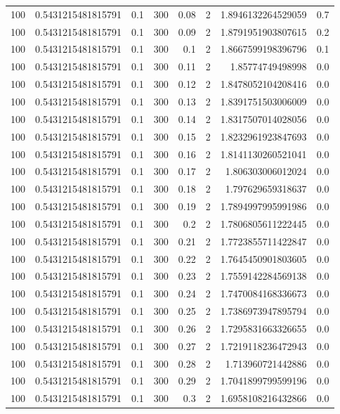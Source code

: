 \documentclass[11pt]{article}
\begin{document}
\begin{center}
\begin{tabular}{rrrrrrrr}
100 & 0.5431215481815791 & 0.1 & 300 & 0.08 & 2 & 1.8946132264529059 & 0.7\\
100 & 0.5431215481815791 & 0.1 & 300 & 0.09 & 2 & 1.8791951903807615 & 0.2\\
100 & 0.5431215481815791 & 0.1 & 300 & 0.1 & 2 & 1.8667599198396796 & 0.1\\
100 & 0.5431215481815791 & 0.1 & 300 & 0.11 & 2 & 1.85774749498998 & 0.0\\
100 & 0.5431215481815791 & 0.1 & 300 & 0.12 & 2 & 1.8478052104208416 & 0.0\\
100 & 0.5431215481815791 & 0.1 & 300 & 0.13 & 2 & 1.8391751503006009 & 0.0\\
100 & 0.5431215481815791 & 0.1 & 300 & 0.14 & 2 & 1.8317507014028056 & 0.0\\
100 & 0.5431215481815791 & 0.1 & 300 & 0.15 & 2 & 1.8232961923847693 & 0.0\\
100 & 0.5431215481815791 & 0.1 & 300 & 0.16 & 2 & 1.8141130260521041 & 0.0\\
100 & 0.5431215481815791 & 0.1 & 300 & 0.17 & 2 & 1.806303006012024 & 0.0\\
100 & 0.5431215481815791 & 0.1 & 300 & 0.18 & 2 & 1.797629659318637 & 0.0\\
100 & 0.5431215481815791 & 0.1 & 300 & 0.19 & 2 & 1.7894997995991986 & 0.0\\
100 & 0.5431215481815791 & 0.1 & 300 & 0.2 & 2 & 1.7806805611222445 & 0.0\\
100 & 0.5431215481815791 & 0.1 & 300 & 0.21 & 2 & 1.7723855711422847 & 0.0\\
100 & 0.5431215481815791 & 0.1 & 300 & 0.22 & 2 & 1.7645450901803605 & 0.0\\
100 & 0.5431215481815791 & 0.1 & 300 & 0.23 & 2 & 1.7559142284569138 & 0.0\\
100 & 0.5431215481815791 & 0.1 & 300 & 0.24 & 2 & 1.7470084168336673 & 0.0\\
100 & 0.5431215481815791 & 0.1 & 300 & 0.25 & 2 & 1.7386973947895794 & 0.0\\
100 & 0.5431215481815791 & 0.1 & 300 & 0.26 & 2 & 1.7295831663326655 & 0.0\\
100 & 0.5431215481815791 & 0.1 & 300 & 0.27 & 2 & 1.7219118236472943 & 0.0\\
100 & 0.5431215481815791 & 0.1 & 300 & 0.28 & 2 & 1.713960721442886 & 0.0\\
100 & 0.5431215481815791 & 0.1 & 300 & 0.29 & 2 & 1.7041899799599196 & 0.0\\
100 & 0.5431215481815791 & 0.1 & 300 & 0.3 & 2 & 1.6958108216432866 & 0.0\\

\end{tabular}
\end{center}
\end{document}
